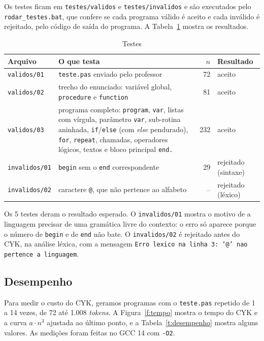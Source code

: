 \documentclass[12pt,a4paper]{article}
\newcommand{\fonte}[1][Elaborado pelos autores (2026).]{%
  \par\vspace{3pt}{\footnotesize Fonte: #1}\par}
\newcommand{\code}[1]{\texttt{#1}}
\begin{document}
Os testes ficam em \code{testes/validos} e \code{testes/invalidos} e são executados pelo
\code{rodar\_testes.bat}, que confere se cada programa válido é aceito e cada inválido é
rejeitado, pelo código de saída do programa. A Tabela~\ref{t:testes} mostra os resultados.

\begin{table}[htbp]
\caption{Testes}\label{t:testes}
\centering\small
\begin{tabular}{@{}l>{\raggedright\arraybackslash}p{7.2cm}rl@{}}
\toprule
Arquivo & O que testa & $n$ & Resultado \\
\midrule
\code{validos/01} & \code{teste.pas} enviado pelo professor & 72 & aceito \\
\code{validos/02} & trecho do enunciado: variável global, \code{procedure} e \code{function} & 81 & aceito \\
\code{validos/03} & programa completo: \code{program}, \code{var}, listas com vírgula, parâmetro
\code{var}, sub-rotina aninhada, \code{if}/\code{else} (com \textit{else} pendurado), \code{for},
\code{repeat}, chamadas, operadores lógicos, textos e bloco principal \code{end.} & 232 & aceito \\
\code{invalidos/01} & \code{begin} sem o \code{end} correspondente & 29 & rejeitado (sintaxe) \\
\code{invalidos/02} & caractere \code{@}, que não pertence ao alfabeto & -- & rejeitado (léxico) \\
\bottomrule
\end{tabular}
\fonte
\end{table}

Os 5 testes deram o resultado esperado. O \code{invalidos/01} mostra o motivo de a linguagem
precisar de uma gramática livre do contexto: o erro só aparece porque o número de \code{begin} e
de \code{end} não bate. O \code{invalidos/02} é rejeitado antes do CYK, na análise léxica, com a
mensagem \code{Erro lexico na linha 3: '@' nao pertence a linguagem}.

\subsection{Desempenho}

Para medir o custo do CYK, geramos programas com o \code{teste.pas} repetido de 1 a 14 vezes,
de 72 até 1.008 \textit{tokens}. A Figura~\ref{f:tempo} mostra o tempo do CYK e a curva
$a \cdot n^3$ ajustada ao último ponto, e a Tabela~\ref{t:desempenho} mostra alguns valores. As
medições foram feitas no GCC 14 com \code{-O2}.
\end{document}
